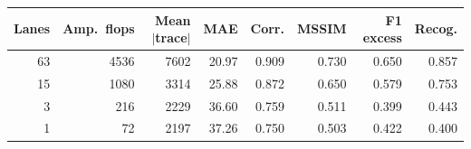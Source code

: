 \begin{tabular}{rrrrrrrr}
\hline
Lanes & Amp.\ flops & Mean $|$trace$|$ & MAE & Corr. & MSSIM & F1 excess & Recog. \\
\hline
63 & 4536 & 7602 & 20.97 & 0.909 & 0.730 & 0.650 & 0.857 \\
15 & 1080 & 3314 & 25.88 & 0.872 & 0.650 & 0.579 & 0.753 \\
3 & 216 & 2229 & 36.60 & 0.759 & 0.511 & 0.399 & 0.443 \\
1 & 72 & 2197 & 37.26 & 0.750 & 0.503 & 0.422 & 0.400 \\
\hline
\end{tabular}
